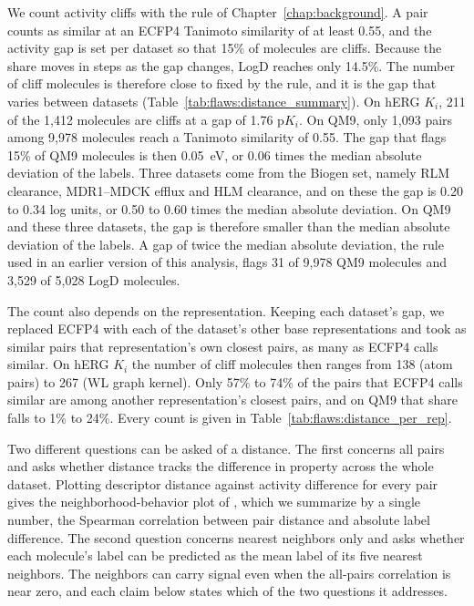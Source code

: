 We count activity cliffs with the rule of Chapter~\ref{chap:background}. A pair counts as similar at an ECFP4 Tanimoto similarity of at least 0.55, and the activity gap is set per dataset so that 15\% of molecules are cliffs. Because the share moves in steps as the gap changes, LogD reaches only 14.5\%. The number of cliff molecules is therefore close to fixed by the rule, and it is the gap that varies between datasets (Table~\ref{tab:flaws:distance_summary}). On hERG $K_i$, 211 of the 1,412 molecules are cliffs at a gap of 1.76 p$K_i$. On QM9, only 1,093 pairs among 9,978 molecules reach a Tanimoto similarity of 0.55. The gap that flags 15\% of QM9 molecules is then 0.05~eV, or 0.06 times the median absolute deviation of the labels. Three datasets come from the Biogen set, namely RLM clearance, MDR1--MDCK efflux and HLM clearance, and on these the gap is 0.20 to 0.34 log units, or 0.50 to 0.60 times the median absolute deviation. On QM9 and these three datasets, the gap is therefore smaller than the median absolute deviation of the labels. A gap of twice the median absolute deviation, the rule used in an earlier version of this analysis, flags 31 of 9,978 QM9 molecules and 3,529 of 5,028 LogD molecules.

The count also depends on the representation. Keeping each dataset's gap, we replaced ECFP4 with each of the dataset's other base representations and took as similar pairs that representation's own closest pairs, as many as ECFP4 calls similar. On hERG $K_i$ the number of cliff molecules then ranges from 138 (atom pairs) to 267 (WL graph kernel). Only 57\% to 74\% of the pairs that ECFP4 calls similar are among another representation's closest pairs, and on QM9 that share falls to 1\% to 24\%. Every count is given in Table~\ref{tab:flaws:distance_per_rep}.

Two different questions can be asked of a distance. The first concerns all pairs and asks whether distance tracks the difference in property across the whole dataset. Plotting descriptor distance against activity difference for every pair gives the neighborhood-behavior plot of \citet{Patterson1996}, which we summarize by a single number, the Spearman correlation between pair distance and absolute label difference. The second question concerns nearest neighbors only and asks whether each molecule's label can be predicted as the mean label of its five nearest neighbors. The neighbors can carry signal even when the all-pairs correlation is near zero, and each claim below states which of the two questions it addresses.

